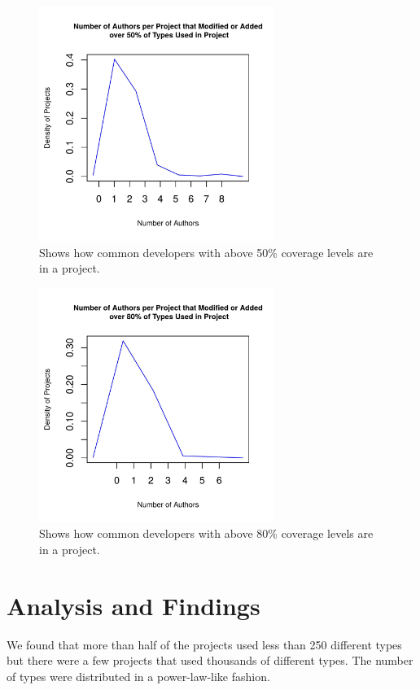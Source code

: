 \documentclass{sig-alternate-05-2015}
\begin{document}
\begin{figure}[t]
\centering
\includegraphics[height=3in, width=3in]{../lib_stats_Threshold50_dist}
\caption{Shows how common developers with above 50\% coverage levels are in a project.}
\label{lib_stats_Threshold50_dist}
\end{figure}

\begin{figure}[t]
\centering
\includegraphics[height=3in, width=3in]{../lib_stats_Threshold80_dist}
\caption{Shows how common developers with above 80\% coverage levels are in a project.}
\label{lib_stats_Threshold80_dist}
\end{figure}

\section{Analysis and Findings}
We found that more than half of the projects used less than 250 different types but there were a few projects that used thousands of different types. The number of types were distributed in a power-law-like fashion.
\end{document}
